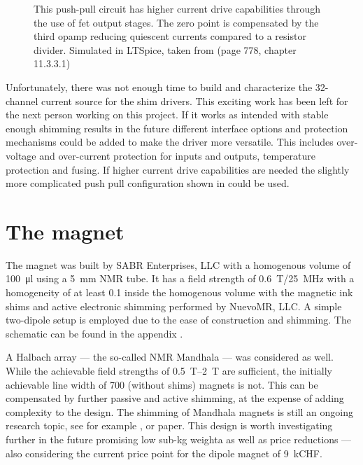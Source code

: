 \begin{figure}[hbt]
    \centering
    
    \caption{ This push-pull circuit has higher current drive capabilities through the use of \acrshort{fet} output stages. The zero point is compensated by the third \acrshort{opamp} reducing quiescent currents compared to a resistor divider. Simulated in LTSpice, taken from \cite{tietzeHalbleiterSchaltungstechnik2019} (page 778, chapter 11.3.3.1)}
\end{figure}

Unfortunately, there was not enough time to build and characterize the 32-channel current source for the shim drivers. This exciting work has been left for the next person working on this project. If it works as intended with stable enough shimming results in the future different interface options and protection mechanisms could be added to make the driver more versatile. This includes over-voltage and over-current protection for inputs and outputs, temperature protection and fusing. If higher current drive capabilities are needed the slightly more complicated push pull configuration shown in  could be used.

\section{The magnet}
The magnet was built by SABR Enterprises, LLC with a homogenous volume of \qty{100}{\micro\litre} using a \qty{5}{\milli\metre} NMR tube. It has a field strength of \qty{0.6}{\tesla}/\qty{25}{\mega\hertz} with a homogeneity of at least \qty{0.1}{\partspermillion} inside the homogenous volume with the magnetic ink shims and active electronic shimming performed by NuevoMR, LLC. A simple two-dipole setup is employed due to the ease of construction and shimming. The schematic can be found in the appendix .

A Halbach array --- the so-called NMR Mandhala --- was considered as well. While the achievable field strengths of \qtyrange{0.5}{2}{\tesla}  are sufficient, the initially achievable line width of \qty{700}{\partspermillion} \cite{raichDesignConstructionDipolar2004} (without shims) magnets is not. This can be compensated by further passive and active shimming, at the expense of adding complexity to the design. The shimming of Mandhala magnets is still an ongoing research topic, see for example ,  or  paper. This design is worth investigating further in the future promising low sub-kg weighta as well as price reductions --- also considering the current price point for the dipole magnet of \approx \qty{9}{kCHF}.

